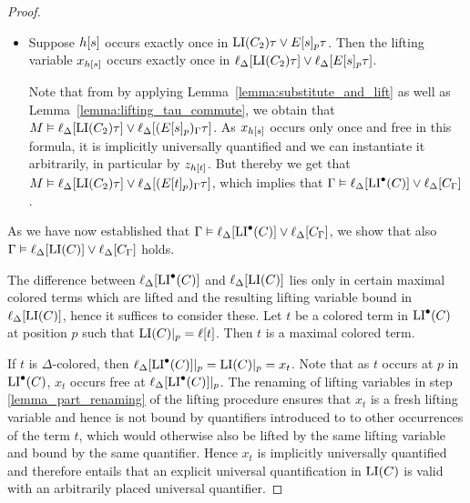 \begin{proof}
\begin{description}
\begin{itemize}
\begin{itemize}
						\item Suppose $h[s]$ occurs exactly once in $\operatorname{LI}(C_2)\tau \lor E{[s]_{p}}\tau$.
							Then the lifting variable $x_{h[s]}$ 
							occurs exactly once in $\ell_{\Delta}[\operatorname{LI}(C_2)\tau] \lor \ell_{\Delta}[E{[s]_{p}}\tau]$.

							Note that from \markB{} by applying Lemma~\ref{lemma:substitute_and_lift} as well as Lemma~\ref{lemma:lifting_tau_commute}, we obtain that $M\vDash \ell_{\Delta}[\operatorname{LI}(C_2)\tau] \lor \ell_{\Delta}[(E{[s]_{p}})_\Gamma\tau]$.
							As $x_{h[s]}$ occurs only once and free in this formula, it is implicitly universally quantified and we can instantiate it arbitrarily, in particular by $z_{h[t]}$.
							But thereby we get that 
							$M\vDash \ell_{\Delta}[\operatorname{LI}(C_2)\tau] \lor \ell_{\Delta}[(E{[t]_{p}})_\Gamma\tau]$, 
							which implies that
							$\Gamma\vDash \ell_{\Delta}[\operatorname{LI}^\bullet(C)] \lor \ell_{\Delta}[C_\Gamma]$.
					\end{itemize}
			\end{itemize}
	\end{description}



	As we have now established that
	$\Gamma \vDash \ell_{\Delta}[ \operatorname{LI}^\bullet(C) ] \lor \ell_{\Delta}[C_\Gamma]$,
	we show that also
	$\Gamma \vDash \ell_{\Delta}[ \operatorname{LI}(C) ] \lor \ell_{\Delta}[C_\Gamma]$ holds.


	The difference between $\ell_{\Delta}[\operatorname{LI}^\bullet(C)]$ and $\ell_{\Delta}[\operatorname{LI}(C)]$ lies only in certain maximal colored terms which are lifted and the resulting lifting variable bound in $\ell_{\Delta}[\operatorname{LI}(C)]$, hence it suffices to consider these.
	Let $t$ be a colored term in $\operatorname{LI}^\bullet(C)$ at position $p$ such that $\operatorname{LI}(C)|_{p} = \ell[t]$.
	Then $t$ is a maximal colored term. %

	If $t$ is $\Delta$-colored, then $\ell_{\Delta}[\operatorname{LI}^\bullet(C)]|_{p} = \operatorname{LI}(C)|_{p} = x_t$.
	Note that as $t$ occurs at $p$ in $\operatorname{LI}^\bullet(C)$, $x_t$ occurs free at $\ell_{\Delta}[\operatorname{LI}^\bullet(C)]|_{p}$.
	The renaming of lifting variables in step \ref{lemma_part_renaming} of the lifting procedure
	ensures that $x_t$ is a fresh lifting variable and hence is not bound by quantifiers introduced to to other occurrences of the term $t$, which would otherwise also be lifted by the same lifting variable and bound by the same quantifier.
	Hence $x_t$ is implicitly universally quantified and therefore entails that an explicit universal quantification in $\operatorname{LI}(C)$ is valid with an arbitrarily placed universal quantifier. 


\end{proof}
